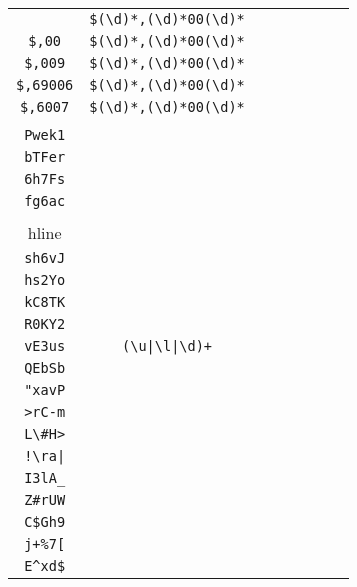 \begin{longtable}{cccccccc}
\begin{tabular}{ll}
    \verb|$,300| & \verb|$(\d)*,(\d)*00(\d)*|\\
\verb|$,00| & \verb|$(\d)*,(\d)*00(\d)*|\\
\verb|$,009| & \verb|$(\d)*,(\d)*00(\d)*|\\
\verb|$,69006| & \verb|$(\d)*,(\d)*00(\d)*|\\
\verb|$,6007| & \verb|$(\d)*,(\d)*00(\d)*|
\end{tabular}
\\\midrule 
\begin{tabular}{l}
    \verb|nIqsz|\\
\verb|Pwek1|\\
\verb|bTFer|\\
\verb|6h7Fs|\\
\verb|fg6ac|\\
\\hline\\
\verb|sh6vJ|\\
\verb|hs2Yo|\\
\verb|kC8TK|\\
\verb|R0KY2|\\
\verb|vE3us|
\end{tabular}

&
\verb.(\u|\l|\d)+.
&

\begin{tabular}{l}
    \verb|.....|\\
\verb|QEbSb|\\
\verb|"xavP|\\
\verb|>rC-m|\\
\verb|L\#H>|\\
\verb.!\ra|.
\end{tabular}

&

\begin{tabular}{l}
    \verb|.....|\\
\verb|I3lA_|\\
\verb|Z#rUW|\\
\verb|C$Gh9|\\
\verb|j+%7[|\\
\verb|E^xd$|
\end{tabular}

&


\end{longtable}
